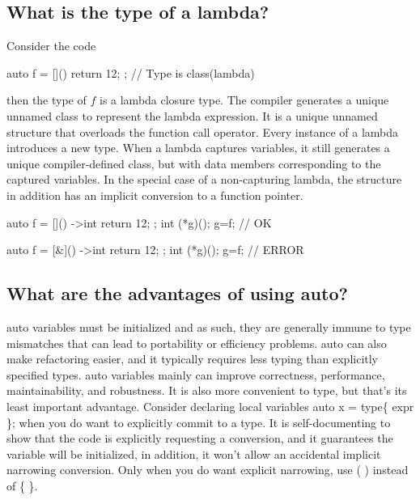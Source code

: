 \documentclass{report}
\begin{document}
 \bigbreak \noindent 
 \subsection{What is the type of a lambda?}
 \bigbreak \noindent 
 Consider the code
 \bigbreak \noindent 
 \begin{cppcode}
     auto f = []() { return 12; }; // Type is class(lambda)
 \end{cppcode}
 \bigbreak \noindent 
 then the type of $f$ is a lambda closure type. The compiler generates a unique unnamed class to represent the lambda expression.
 \bigbreak \noindent 
 It is a unique unnamed structure that overloads the function call operator. Every instance of a lambda introduces a new type.
 \bigbreak \noindent 
 When a lambda captures variables, it still generates a unique compiler-defined class, but with data members corresponding to the captured variables.
 \bigbreak \noindent 
 In the special case of a non-capturing lambda, the structure in addition has an implicit conversion to a function pointer.
 \bigbreak \noindent 
 \begin{cppcode}
     auto f = []() ->int {
        return 12;
    };
    int (*g)();
    g=f; // OK

    auto f = [&]() ->int {
        return 12;
    };
    int (*g)();
    g=f; // ERROR
 \end{cppcode}





 \bigbreak \noindent 
 \subsection{What are the advantages of using auto?}
 \bigbreak \noindent 
 auto variables must be initialized and as such, they are generally immune to type mismatches that can lead to portability or efficiency problems. auto can also make refactoring easier, and it typically requires less typing than explicitly specified types.
 \bigbreak \noindent 
 auto variables mainly can improve correctness, performance, maintainability, and robustness. It is also more convenient to type, but that’s its least important advantage.
 \bigbreak \noindent 
 Consider declaring local variables auto x = type\{ expr \}; when you do want to explicitly commit to a type. It is self-documenting to show that the code is explicitly requesting a conversion, and
 \bigbreak \noindent 
 it guarantees the variable will be initialized, in addition, it won’t allow an accidental implicit narrowing conversion. Only when you do want explicit narrowing, use ( ) instead of \{ \}.
 \bigbreak \noindent 
\end{document}
